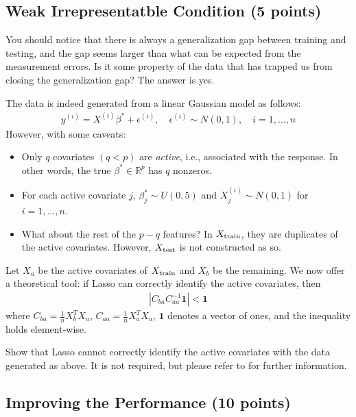 \documentclass{article}
\begin{document}
\subsection{Weak Irrepresentatble Condition (5 points)}

You should notice that there is always a generalization gap between training and testing, and the gap seems larger than what can be expected from the measurement errors. 
Is it some property of the data that has trapped us from closing the generalization gap?
The answer is yes. 

The data is indeed generated from a linear Gaussian model as follows:
\begin{align}
y^{(i)} = X^{(i)} \beta^* + \epsilon^{(i)}, \quad \epsilon^{(i)} \sim N(0, 1), \quad i = 1, \dotsc, n
\end{align}
However, with some caveats: 
\begin{itemize}
\item Only $ q $ covariates $ (q < p) $ are \textit{active}, i.e., associated with the response. 
In other words, the true $ \beta^* \in \mathbb{R}^{p} $ has $ q $ nonzeros. 

\item For each active covariate $ j $, $ \beta^*_j \sim U(0, 5) $ and $ X^{(i)}_{j} \sim N(0, 1) $ for $ i = 1, \dotsc, n $.

\item What about the rest of the $ p - q $ features? 
In $ X_{\textnormal{train}} $, they are duplicates of the active covariates.
However, $ X_{\textnormal{test}} $ is not constructed as so. 
\end{itemize}


Let $ X_a $ be the active covariates of $ X_{\textnormal{train}} $ and $ X_b $ be the remaining. 
We now offer a theoretical tool: if Lasso can correctly identify the active covariates, then 
\begin{align}
| C_{ba} C_{aa}^{-1} \mathbf{1} | < \mathbf{1}
\end{align}
where $C_{ba} = \frac{1}{n} X_b^T X_a$, $ C_{aa} = \frac{1}{n} X_a^T X_a$, $\mathbf{1}$ denotes a vector of ones, and the inequality holds element-wise.



Show that Lasso cannot correctly identify the active covariates with the data generated as above. 
It is not required, but please refer to \citep{zhao2006model} for further information. 





\subsection{Improving the Performance (10 points)} 
\end{document}
